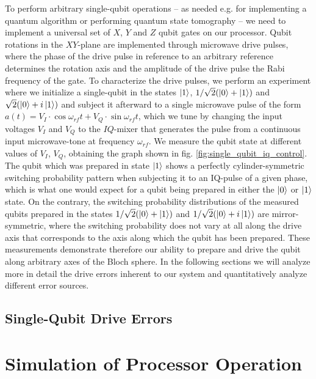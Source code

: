 To perform arbitrary single-qubit operations -- as needed e.g. for implementing a quantum algorithm or performing quantum state tomography -- we need to implement a universal set of $X$, $Y$ and $Z$ qubit gates on our processor. Qubit rotations in the $XY$-plane are implemented through microwave drive pulses, where the phase of the drive pulse in reference to an arbitrary reference determines the rotation axis and the amplitude of the drive pulse the Rabi frequency of the gate. To characterize the drive pulses, we perform an experiment where we initialize a single-qubit in the states $\left| 1 \right>$, $1/\sqrt{2}(\left| 0 \right>+\left| 1 \right>)$ and $\sqrt{2}(\left| 0 \right>+i\left| 1 \right>)$ and subject it afterward to a single microwave pulse of the form $a(t) = V_I\cdot\cos{\omega_{rf}t}+V_Q\cdot\sin{\omega_{rf}t}$, which we tune by changing the input voltages $V_I$ and $V_Q$ to the $IQ$-mixer that generates the pulse from a continuous input microwave-tone at frequency $\omega_{rf}$. We measure the qubit state at different values of $V_I$, $V_Q$, obtaining the graph shown in fig. \ref{fig:single_qubit_iq_control}. The qubit which was prepared in state $\left| 1 \right>$ shows a perfectly cylinder-symmetric switching probability pattern when subjecting it to an IQ-pulse of a given phase, which is what one would expect for a qubit being prepared in either the $\left| 0 \right>$ or $\left| 1 \right>$ state. On the contrary, the switching probability distributions of the measured qubits prepared in the states $1/\sqrt{2}(\left| 0 \right>+\left| 1 \right>)$ and $1/\sqrt{2}(\left| 0 \right>+i\left| 1 \right>)$ are mirror-symmetric, where the switching probability does not vary at all along the drive axis that corresponds to the axis along which the qubit has been prepared. These measurements demonstrate therefore our ability to prepare and drive the qubit along arbitrary axes of the Bloch sphere. In the following sections we will analyze more in detail the drive errors inherent to our system and quantitatively analyze different error sources. 

\subsection{Single-Qubit Drive Errors}

\section{Simulation of Processor Operation}

